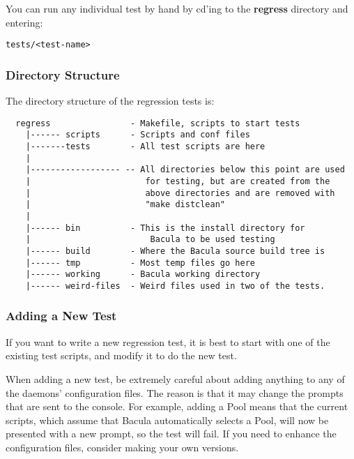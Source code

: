 You can run any individual test by hand by cd'ing to the {\bf regress}
directory and entering: 

\footnotesize
\begin{verbatim}
tests/<test-name>
\end{verbatim}
\normalsize

\subsubsection*{Directory Structure}

The directory structure of the regression tests is: 

\footnotesize
\begin{verbatim}
  regress                - Makefile, scripts to start tests
    |------ scripts      - Scripts and conf files
    |-------tests        - All test scripts are here
    |
    |------------------ -- All directories below this point are used
    |                       for testing, but are created from the
    |                       above directories and are removed with
    |                       "make distclean"
    |
    |------ bin          - This is the install directory for
    |                        Bacula to be used testing
    |------ build        - Where the Bacula source build tree is
    |------ tmp          - Most temp files go here
    |------ working      - Bacula working directory
    |------ weird-files  - Weird files used in two of the tests.
\end{verbatim}
\normalsize

\subsubsection*{Adding a New Test}

If you want to write a new regression test, it is best to start with one of
the existing test scripts, and modify it to do the new test. 

When adding a new test, be extremely careful about adding anything to any of
the daemons' configuration files. The reason is that it may change the prompts
that are sent to the console. For example, adding a Pool means that the
current scripts, which assume that Bacula automatically selects a Pool, will
now be presented with a new prompt, so the test will fail. If you need to
enhance the configuration files, consider making your own versions. 
